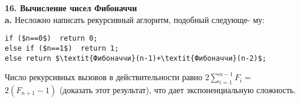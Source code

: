 \noindent\textbf{16. Вычисление чисел Фибоначчи}\\

\hspace*{15pt}\textbf{a.} Несложно написать рекурсивный аглоритм, подобный следующе-\linebreak
му:
\begin{lstlisting}[xleftmargin=15pt, mathescape=true]
if ($n==0$)  return 0;
else if ($n==1$)  return 1;
else return $\textit{Фибоначчи}(n-1)+\textit{Фибоначчи}(n-2)$;
\end{lstlisting}
\hspace*{15pt}Число рекурсивных вызовов в действительности равно $2\sum_{i=1}^{n-1}F_i=$\linebreak
$2(F_{n+1}-1)$ (доказать этот результат), что дает экспоненциальную\linebreak
сложность.\newpage



